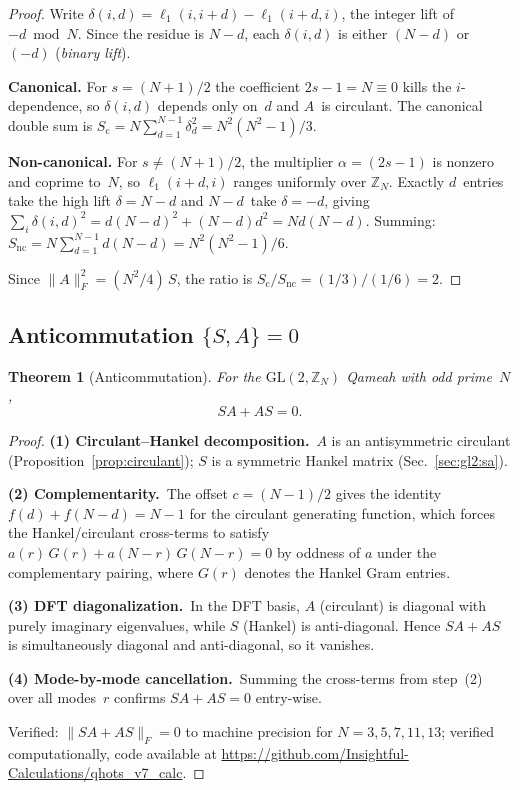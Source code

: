 \documentclass[aip,jmp,reprint,superscriptaddress,floatfix,nofootinbib]{revtex4-2}
\newtheorem{theorem}{Theorem}
\theoremstyle{definition}
\theoremstyle{remark}
\newcommand{\ZN}{\mathbb{Z}_N}
\newcommand{\GL}{\mathrm{GL}}
\begin{document}
\begin{proof}
Write $\delta(i,d) = \ell_1(i,i{+}d) - \ell_1(i{+}d,i)$, the integer
lift of $-d \bmod N$.  Since the residue is $N{-}d$, each
$\delta(i,d)$ is either $(N{-}d)$ or $(-d)$ (\emph{binary lift}).

\textbf{Canonical.}
For $s = (N{+}1)/2$ the coefficient $2s{-}1 = N \equiv 0$ kills the
$i$-dependence, so $\delta(i,d)$ depends only on~$d$ and $A$~is
circulant.  The canonical double sum is
$S_{\mathrm{c}} = N \sum_{d=1}^{N-1} \delta_d^2 = N^2(N^2{-}1)/3$.

\textbf{Non-canonical.}
For $s \ne (N{+}1)/2$, the multiplier $\alpha = (2s{-}1)$ is nonzero
and coprime to~$N$, so $\ell_1(i{+}d,i)$ ranges uniformly over
$\mathbb{Z}_N$.  Exactly $d$~entries take the high lift
$\delta = N{-}d$ and $N{-}d$~take $\delta = {-}d$, giving
$\sum_i \delta(i,d)^2 = d(N{-}d)^2 + (N{-}d)d^2 = Nd(N{-}d)$.
Summing: $S_{\mathrm{nc}} = N\sum_{d=1}^{N-1} d(N{-}d) = N^2(N^2{-}1)/6$.

Since $\|A\|_F^2 = (N^2/4)\,S$, the ratio is
$S_{\mathrm{c}}/S_{\mathrm{nc}} = (1/3)/(1/6) = 2$.
\end{proof}

\subsection{Anticommutation \texorpdfstring{$\{S,A\} = 0$}{\{S,A\} = 0}}
\label{sec:gl2:anticomm}

\begin{theorem}[Anticommutation]\label{thm:anticomm}
For the $\GL(2,\ZN)$ Qameah with odd prime~$N$,
\begin{equation}\label{eq:anticomm}
SA + AS = 0.
\end{equation}
\end{theorem}

\begin{proof}
\textbf{(1) Circulant--Hankel decomposition.}~$A$ is an antisymmetric
circulant (Proposition~\ref{prop:circulant}); $S$ is a symmetric
Hankel matrix (Sec.~\ref{sec:gl2:sa}).

\textbf{(2) Complementarity.}~The offset $c = (N{-}1)/2$ gives the
identity $f(d) + f(N{-}d) = N - 1$ for the circulant generating
function, which forces the Hankel/circulant cross-terms to satisfy
$a(r)\,G(r) + a(N{-}r)\,G(N{-}r) = 0$ by oddness of $a$ under the
complementary pairing, where $G(r)$ denotes the Hankel Gram entries.

\textbf{(3) DFT diagonalization.}~In the DFT basis, $A$ (circulant)
is diagonal with purely imaginary eigenvalues, while $S$ (Hankel) is
anti-diagonal.  Hence $SA + AS$ is simultaneously diagonal and
anti-diagonal, so it vanishes.

\textbf{(4) Mode-by-mode cancellation.}~Summing the cross-terms
from step~(2) over all modes~$r$ confirms $SA + AS = 0$ entry-wise.

Verified: $\|SA + AS\|_F = 0$ to machine precision for
$N = 3, 5, 7, 11, 13$; verified computationally, code available at
\url{https://github.com/Insightful-Calculations/qhots_v7_calc}.
\end{proof}
\end{document}
